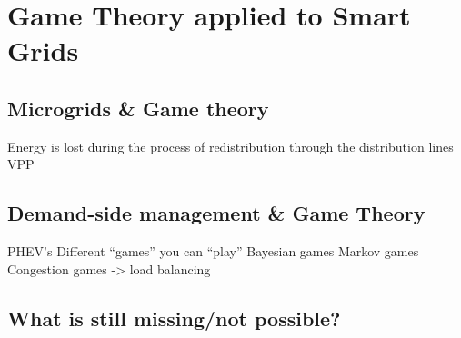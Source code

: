 \section{Game Theory applied to Smart Grids}
\subsection{Microgrids \& Game theory}
Energy is lost during the process of redistribution through the distribution lines
VPP
\subsection{Demand-side management \& Game Theory}
PHEV’s
Different “games” you can “play”
Bayesian games
Markov games
Congestion games -> load balancing
\subsection{What is still missing/not possible?}
